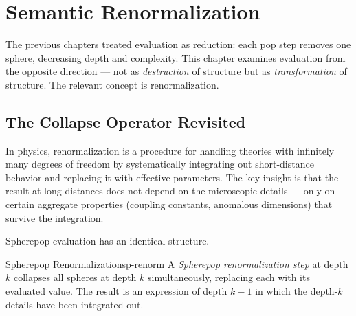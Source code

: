 
\chapter{Semantic Renormalization}



The previous chapters treated evaluation as reduction: each pop step
removes one sphere, decreasing depth and complexity. This chapter examines
evaluation from the opposite direction — not as \emph{destruction} of
structure but as \emph{transformation} of structure. The relevant concept
is renormalization.

\section{The Collapse Operator Revisited}

In physics, renormalization is a procedure for handling theories with
infinitely many degrees of freedom by systematically integrating out
short-distance behavior and replacing it with effective parameters.
The key insight is that the result at long distances does not depend
on the microscopic details — only on certain aggregate properties
(coupling constants, anomalous dimensions) that survive the integration.

Spherepop evaluation has an identical structure.

\begin{definition}{Spherepop Renormalization}{sp-renorm}
  A \emph{Spherepop renormalization step} at depth $k$ collapses all
  spheres at depth $k$ simultaneously, replacing each with its evaluated
  value. The result is an expression of depth $k-1$ in which the
  depth-$k$ details have been integrated out.
\end{definition}

